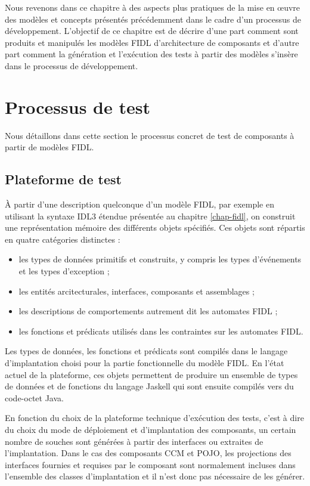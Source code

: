 
Nous revenons dans ce chapitre \`a des aspects plus pratiques de la
mise en  \oe uvre des mod\`eles et concepts pr\'esent\'es
pr\'ec\'edemment dans le cadre d'un processus de d\'eveloppement. 
L'objectif de ce chapitre est de d\'ecrire d'une part comment sont produits et
manipul\'es les mod\`eles \textsf{FIDL} d'architecture de
composants et d'autre part comment la g\'en\'eration et
l'ex\'ecution des tests \`a partir des mod\`eles s'ins\`ere dans
le processus de d\'eveloppement. 

\section{Processus de test}

Nous d\'etaillons dans cette section le processus concret de test de
composants \`a partir de mod\`eles \textsf{FIDL}.

\subsection{Plateforme de test}

\`A partir d'une description quelconque d'un mod\`ele FIDL, par
exemple en utilisant la syntaxe \textsf{IDL3} \'etendue
pr\'esent\'ee au chapitre \ref{chap-fidl}, on construit une
repr\'esentation m\'emoire des diff\'erents objets
sp\'ecifi\'es. Ces objets sont r\'epartis en quatre cat\'egories distinctes :
\begin{itemize}
  \item les types de donn\'ees primitifs et construits, y compris les types
    d'\'ev\'enements et les types d'exception ;
  \item les entit\'es arcitecturales, interfaces, composants et
    assemblages ; 
  \item les descriptions de comportements autrement dit les automates
    \textsf{FIDL} ;
  \item les fonctions et pr\'edicats utilis\'es dans les contraintes
  sur les automates \textsf{FIDL}.
\end{itemize}

Les types de donn\'ees, les fonctions et pr\'edicats sont
compil\'es dans le langage d'implantation choisi pour la partie
fonctionnelle du mod\`ele \textsf{FIDL}. En l'\'etat actuel de la
plateforme, ces objets permettent de produire un ensemble de types de
donn\'ees et de fonctions du langage Jaskell qui sont ensuite
compil\'es vers du code-octet \textsf{Java}. 

En fonction du choix de la plateforme technique d'ex\'ecution des
tests, c'est \`a dire du choix du mode de d\'eploiement et
d'implantation des composants, un certain nombre de souches sont
g\'en\'er\'ees \`a partir des interfaces ou extraites de
l'implantation. Dans le cas des composants CCM et POJO, les
projections des interfaces fournies et requises par le composant sont
normalement incluses dans l'ensemble des classes d'implantation et il
n'est donc pas n\'ecessaire de les g\'en\'erer. 


